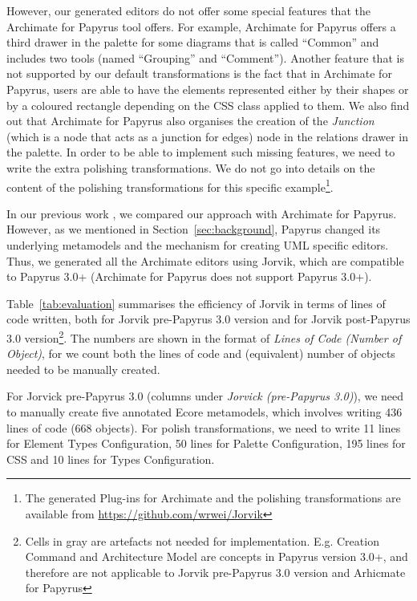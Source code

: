 However, our generated editors do not offer some special features that the Archimate for Papyrus tool offers. 
For example, Archimate for Papyrus offers a third drawer in the palette for some diagrams that is called ``Common'' and includes two tools (named ``Grouping'' and ``Comment''). 
Another feature that is not supported by our default transformations is the fact that in Archimate for Papyrus, users are able to have the elements represented either by their shapes or by a coloured rectangle depending on the CSS class applied to them. 
We also find out that Archimate for Papyrus also organises the creation of the \textit{Junction} (which is a node that acts as a junction for edges) node in the relations drawer in the palette. 
In order to be able to implement such missing features, we need to write the extra polishing transformations. 
We do not go into details on the content of the polishing transformations for this specific example\footnote{The generated Plug-ins for Archimate and the polishing transformations are available from \url{https://github.com/wrwei/Jorvik}}.

In our previous work \cite{zolotas2018towards}, we compared our approach with Archimate for Papyrus. 
However, as we mentioned in Section~\ref{sec:background}, Papyrus changed its underlying metamodels and the mechanism for creating UML specific editors. 
Thus, we generated all the Archimate editors using Jorvik, which are compatible to Papyrus 3.0+ (Archimate for Papyrus does not support Papyrus 3.0+). 

Table~\ref{tab:evaluation} summarises the efficiency of Jorvik in terms of lines of code written, both for Jorvik pre-Papyrus 3.0 version and for Jorvik post-Papyrus 3.0 version\footnote{Cells in gray are artefacts not needed for implementation. E.g. Creation Command and Architecture Model are concepts in Papyrus version 3.0+, and therefore are not applicable to Jorvik pre-Papyrus 3.0 version and Arhicmate for Papyrus}.
The numbers are shown in the format of \textit{Lines of Code (Number of Object)}, for we count both the lines of code and (equivalent) number of objects needed to be manually created.

For Jorvick pre-Papyrus 3.0 (columns under \textit{Jorvick (pre-Papyrus 3.0)}), we need to manually create five annotated Ecore metamodels, which involves writing 436 lines of code (668 objects). 
For polish transformations, we need to write 11 lines for Element Types Configuration, 50 lines for Palette Configuration, 195 lines for CSS and 10 lines for Types Configuration.


